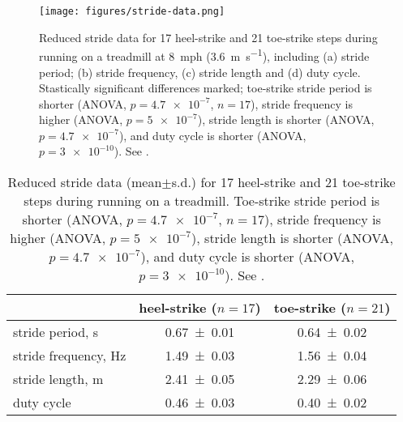 \begin{figure}
\begin{center}
\texttt{[image: figures/stride-data.png]}
\end{center}
\caption{Reduced stride data for 17 heel-strike and 21 toe-strike steps during running on a treadmill at \SI{8}{mph} (\SI{3.6}{\meter\per\second}), including (a) stride period; (b) stride frequency, (c) stride length and (d) duty cycle. Stastically significant differences marked; toe-strike stride period is shorter (ANOVA, $p=\num{4.7e-7}$, $n=17$), stride frequency is higher (ANOVA, $p=\num{5e-7}$), stride length is shorter (ANOVA, $p=\num{4.7e-7}$), and duty cycle is shorter (ANOVA, $p=\num{3e-10}$). See .} 
\label{fig:results:stride}
\end{figure}

\begin{table}
\caption{Reduced stride data (mean$\pm$s.d.) for 17 heel-strike and 21 toe-strike steps during running on a treadmill. Toe-strike stride period is shorter (ANOVA, $p=\num{4.7e-7}$, $n=17$), stride frequency is higher (ANOVA, $p=\num{5e-7}$), stride length is shorter (ANOVA, $p=\num{4.7e-7}$), and duty cycle is shorter (ANOVA, $p=\num{3e-10}$). See .}
\label{tab:results:stride}
\begin{center}
\begin{tabular}{lcc}
\toprule
& heel-strike ($n=17$) & toe-strike ($n=21$)\\
\midrule 
stride period, \si{\second}   & \num{0.67\pm0.01} & \num{0.64\pm0.02} \\
stride frequency, \si{\hertz} & \num{1.49\pm0.03} & \num{1.56\pm0.04} \\
stride length, \si{\meter}    & \num{2.41\pm0.05} & \num{2.29\pm0.06} \\
duty cycle                    & \num{0.46\pm0.03} & \num{0.40\pm0.02} \\
\bottomrule
\end{tabular}
\end{center}
\end{table}

